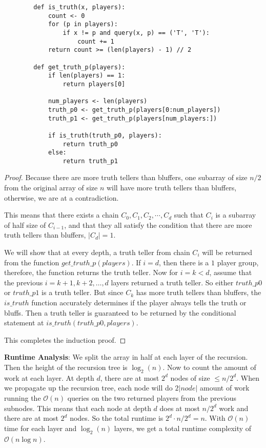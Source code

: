 \documentclass{article}
\begin{document}
\begin{itemize}
\begin{answer}
\begin{verbatim}
        def is_truth(x, players):
            count <- 0
            for (p in players):
                if x != p and query(x, p) == ('T', 'T'):
                    count += 1
            return count >= (len(players) - 1) // 2

        def get_truth_p(players):
            if len(players) == 1:
                return players[0]

            num_players <- len(players)
            truth_p0 <- get_truth_p(players[0:num_players])
            truth_p1 <- get_truth_p(players[num_players:])

            if is_truth(truth_p0, players):
                return truth_p0
            else:
                return truth_p1
                \end{verbatim}

                \begin{proof}
                    Because there are more truth tellers than bluffers, one subarray of size $n / 2$ from the original array of size $n$ will have more truth tellers than bluffers, otherwise, we are at a contradiction.

                    This means that there exists a chain $C_{0}, C_{1}, C_{2}, \cdots, C_{d}$ such that $C_{i}$ is a subarray of half size of $C_{i - 1}$, and that they all satisfy the condition that there are more truth tellers than bluffers, $\lvert C_{d} \rvert = 1$.

                    We will show that at every depth, a truth teller from chain $C_{i}$ will be returned from the function $get\_truth\_p(players)$. If $i = d$, then there is a $1$ player group, therefore, the function returns the truth teller. Now for $i = k < d$, assume that the previous $i = k + 1, k + 2, \ldots, d$ layers returned a truth teller. So either $truth\_{p0}$ or $truth\_{p1}$ is a truth teller. But since $C_{k}$ has more truth tellers than bluffers, the $is\_{truth}$ function accurately determines if the player always tells the truth or bluffs. Then a truth teller is guaranteed to be returned by the conditional statement at $is\_{truth}(truth\_{p0}, players)$.

                    This completes the induction proof.
                \end{proof}

                \textbf{Runtime Analysis}: We split the array in half at each layer of the recursion. Then the height of the recursion tree is $\log_{2}(n)$. Now to count the amount of work at each layer. At depth $d$, there are at most $2^{d}$ nodes of size $ \leq n / 2^{d}$. When we propagate up the recursion tree, each node will do $2\lvert node \rvert$ amount of work running the $\mathcal{O}(n)$ queries on the two returned players from the previous subnodes. This means that each node at depth $d$ does at most $n / 2^{d}$ work and there are at most $2^{d}$ nodes. So the total runtime is $2^{d} \cdot n / 2^{d} = n$. With $\mathcal{O}(n)$ time for each layer and $\log_{2}(n)$ layers, we get a total runtime complexity of $\mathcal{O}(n \log{n})$.
            \end{answer}


\end{itemize}
\end{document}
